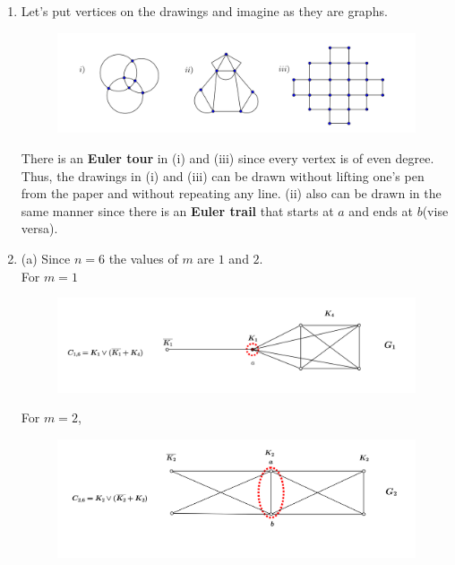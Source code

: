 \documentclass[paper=a4, fontsize=11pt,twoside]{scrartcl}		%
\theoremstyle{definition}
\theoremstyle{remark}
\begin{document}
\begin{enumerate}
  \item Let's put vertices on the drawings and imagine as they are graphs.

  \begin{figure}[hbt!]
\centering
\includegraphics[width=1.0\textwidth]{SolGrapAss4.png}
\end{figure}

  There is an \textbf{Euler tour} in (i) and (iii) since every vertex is of even degree.\\
  Thus, the drawings in (i) and (iii) can be drawn without lifting one's pen from the paper and without repeating any line.
  (ii) also can be drawn in the same manner since there is an \textbf{Euler trail} that starts at $a$ and ends at $b$(vise versa).
  \newpage
  \item (a) Since $n=6$ the values of $m$ are $1$ and $2$.\\
  For $m=1$


  \begin{figure}[hbt!]
\centering
\includegraphics[width=1.0\textwidth]{SolGrapAssp2a.png}
\end{figure}

  For $m=2$,

  \begin{figure}[hbt!]
\centering
\includegraphics[width=1.0\textwidth]{SolGrapAssp2a1.png}
\end{figure}


\end{enumerate}
\end{document}
